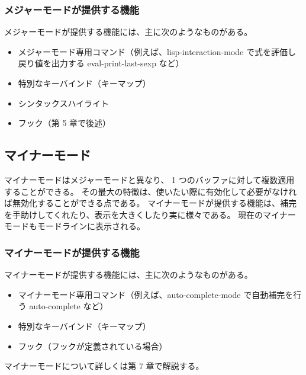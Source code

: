 \subsubsection{メジャーモードが提供する機能}
メジャーモードが提供する機能には、主に次のようなものがある。
\begin{itemize}\setlength{\leftskip}{-1.00zw}%
\item メジャーモード専用コマンド（例えば、lisp-interaction-mode で式を評価し戻り値を出力する eval-print-last-sexp など）
\item 特別なキーバインド（キーマップ）
\item シンタックスハイライト
\item フック（第 5 章で後述）
\end{itemize}
\subsection{マイナーモード}
マイナーモードはメジャーモードと異なり、 1 つのバッファに対して複数適用することができる。
その最大の特徴は、使いたい際に有効化して必要がなければ無効化することができる点である。
マイナーモードが提供する機能は、補完を手助けしてくれたり、表示を大きくしたり実に様々である。
現在のマイナーモードもモードラインに表示される。
\subsubsection{マイナーモードが提供する機能}
マイナーモードが提供する機能には、主に次のようなものがある。
\begin{itemize}\setlength{\leftskip}{-1.00zw}%
\item マイナーモード専用コマンド（例えば、auto-complete-mode で自動補完を行う auto-complete など）
\item 特別なキーバインド（キーマップ）
\item フック（フックが定義されている場合）
\end{itemize}
マイナーモードについて詳しくは第 7 章で解説する。
